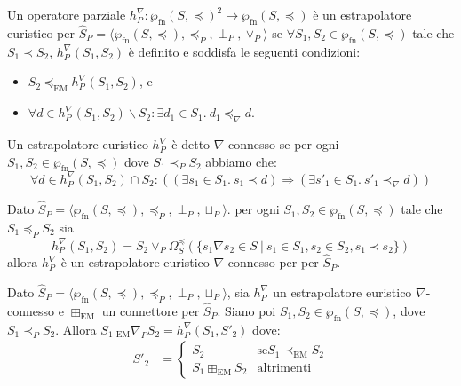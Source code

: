 \begin{definition}
Un operatore parziale \(h_{P}^{\nabla} : \wp_{\textrm{fn}}(S, \preceq)^2\rightarrow\wp_{\textrm{fn}}(S, \preceq)\) è un estrapolatore euristico per \(\hat{S}_P = \langle \wp_{\textrm{fn}}(S, \preceq),\preceq_P, \perp_P ,\vee_P\rangle\) se \(\forall S_1, S_2\in\wp_{\textrm{fn}}(S, \preceq)\) tale che \(S_1 \prec S_2\), \(h_{P}^{\nabla}(S_1, S_2)\) è definito e soddisfa le seguenti condizioni:
\begin{itemize}
	\item \(S_2 \preceq_{\textrm{EM}}h_{P}^{\nabla}(S_1, S_2)\), e
	\item \(\forall d \in h_{P}^{\nabla}(S_1, S_2)\backslash S_2 : \exists d_1\in S_1.\ d_1\preceq_{\nabla} d\).
\end{itemize}
\end{definition}

\begin{definition}\label{def:estrapolatoreEuristicoWideningConnesso}
Un estrapolatore euristico \(h_{P}^{\nabla}\)
è detto \(\nabla\)-connesso se per ogni \(S_1, S_2\in\wp_{\textrm{fn}}(S, \preceq)\) dove \(S_1\prec_P S_2\) abbiamo che:
\[\forall d \in h_{P}^{\nabla}(S_1, S_2)\cap S_2:((\exists s_1\in S_1.\ s_1\prec d)\Rightarrow (\exists s'_1\in S_1.\ s'_1 \prec_{\nabla} d))\]
\end{definition}

\begin{proposition}\label{prop:estrapolatoreEuristicoWideningConnesso}
Dato \(\hat{S}_P = \langle \wp_{\textrm{fn}}(S, \preceq),\preceq_P, \perp_P ,\sqcup_P\rangle\). per ogni \(S_1, S_2\in\wp_{\textrm{fn}}(S, \preceq)\) tale che \(S_1\preceq_P S_2\) sia
\[h_{P}^{\nabla}(S_1, S_2) = S_2\vee_P\Omega_{S}^{\preceq}(\lbrace s_1\nabla s_2 \in S\ \vert\ s_1\in S_1, s_2\in S_2, s_1\prec s_2 \rbrace)\]
allora \(h_{P}^{\nabla}\) è un estrapolatore euristico \(\nabla\)-connesso per per \(\hat{S}_P\).
\end{proposition}

\begin{definition}\label{def:wideningPowersetDomain}
Dato \(\hat{S}_P = \langle \wp_{\textrm{fn}}(S, \preceq),\preceq_P, \perp_P ,\sqcup_P\rangle\), sia \(h_{P}^{\nabla}\) un estrapolatore euristico \(\nabla\)-connesso e \(\boxplus_{\textrm{EM}}\) un connettore per \(\hat{S}_P\). Siano poi \(S_1, S_2\in\wp_{\textrm{fn}}(S, \preceq)\), dove \(S_1\prec_P S_2\). Allora \(S_1\ _{\textrm{EM}}\nabla_P S_2 = h_{P}^{\nabla}(S_1, S'_2)\) dove:
	\begin{align*}
	S'_2 &=  \begin{cases}
				S_2 &\textrm{se} S_1\prec_{\textrm{EM}} S_2 \\
				S_1\boxplus_{\textrm{EM}} S_2 &\textrm{altrimenti}
				\end{cases}
	\end{align*}
\end{definition}
